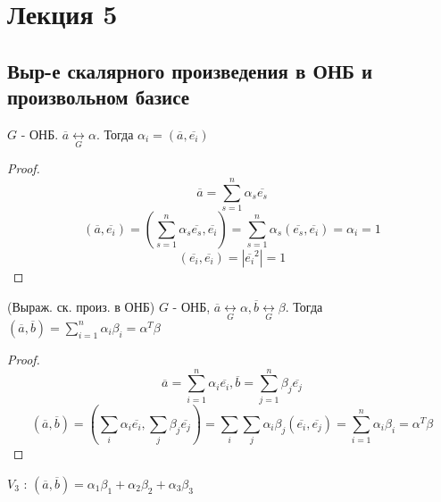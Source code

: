 \section{Лекция 5}

\subsection{Выр-е скалярного произведения в ОНБ и произвольном базисе}

\begin{statement}
  $G$ - ОНБ. $\overline{a} \underset{G}{\longleftrightarrow} \alpha$. Тогда $\alpha_i = (\overline{a}, \overline{e_i})$
\end{statement}
\begin{proof}
\[
\overline{a} = \sum_{s = 1}^{n}  \alpha_s \overline{e_s}
\]
\[
  (\overline{a}, \overline{e_i}) = (\sum_{s = 1}^{n} \alpha_s \overline{e_s}, \overline{e_i}) = \sum_{s = 1}^{n}  \alpha_s (\overline{e_s}, \overline{e_i}) = \alpha_i = 1
\] 
\[
  (\overline{e_i}, \overline{e_i}) = |\overline{e_i}^{2}| = 1
\] 
\end{proof}
\begin{theorem} (Выраж. ск. произ. в ОНБ)
$G$ - ОНБ, $\overline{a} \underset{G}{\longleftrightarrow}\alpha, \overline{b} \underset{G}{\longleftrightarrow} \beta$. Тогда $(\overline{a}, \overline{b}) = \sum_{i = 1}^{n}  \alpha_i \beta_i = \alpha^{T} \beta$
\end{theorem}

\begin{proof}
  \[
  \overline{a} = \sum_{i = 1}^{n} \alpha_i \overline{e_i}, \overline{b} = \sum_{j = 1}^{n} \beta_j \overline{e_j}
  \] 
  \[
    (\overline{a}, \overline{b}) = (\sum_{i}^{} \alpha_i \overline{e_i}, \sum_{j}^{} \beta_j \overline{e_j}) = \sum_{i}^{} \sum_{j}^{} \alpha_i \beta_j (\overline{e_i}, \overline{e_j}) = \sum_{i = 1}^{n} \alpha_i \beta_i = \alpha^{T} \beta
  \] 
\end{proof}
\begin{note}
$V_3$ : $(\overline{a}, \overline{b}) = \alpha_1 \beta_1 + \alpha_2 \beta_2 + \alpha_3 \beta_3$
\end{note}

